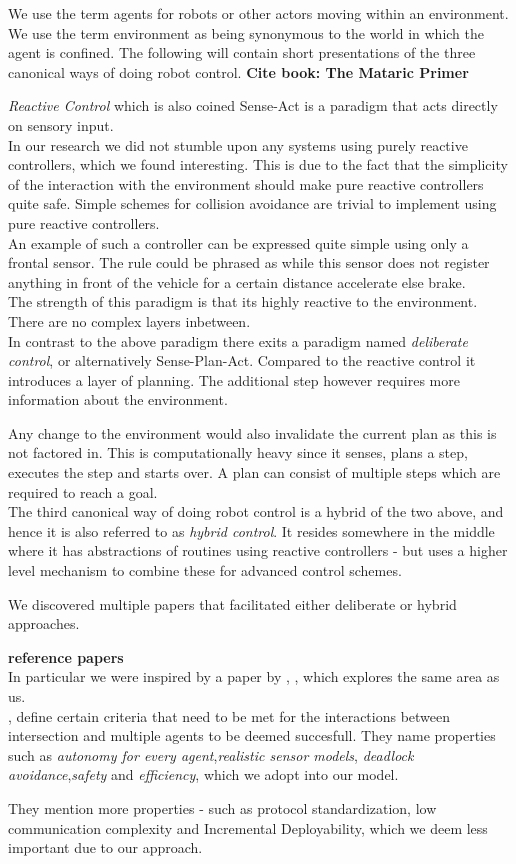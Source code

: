We use the term agents for robots or other actors moving within an environment.\\
We use the term environment as being synonymous to the world in which the agent is confined.
The following will contain short presentations of the three canonical ways of doing robot control.
\textbf{ Cite book: The Mataric Primer }

\textit{Reactive Control} which is also coined Sense-Act is a paradigm that acts directly on sensory input.\\
In our research we did not stumble upon any systems using purely reactive controllers, which we found interesting. This is due to the fact that the simplicity of the interaction with the environment should make pure reactive controllers quite safe.
Simple schemes for collision avoidance are trivial to implement using pure reactive controllers.\\
An example of such a controller can be expressed quite simple using only a frontal sensor. The rule could be phrased as while this sensor does not register anything in front of the vehicle for a certain distance accelerate else brake.\\
The strength of this paradigm is that its highly reactive to the environment. There are no complex layers inbetween.\\

In contrast to the above paradigm there exits a paradigm named \textit{deliberate control}, or alternatively Sense-Plan-Act.
Compared to the reactive control it introduces a layer of planning.
The additional step however requires more information about the environment.

Any change to the environment would also invalidate the current plan as this is not factored in.
This is computationally heavy since it senses, plans a step, executes the step and starts over.
A plan can consist of multiple steps which are required to reach a goal.\\

The third canonical way of doing robot control is a hybrid of the two above, and hence it is also referred to as \textit{hybrid control}.
It resides somewhere in the middle where it has abstractions of routines using reactive controllers - but uses a higher level mechanism to combine these for advanced control schemes.

We discovered multiple papers that facilitated either deliberate or hybrid approaches.

\textbf{reference papers}\\

In particular we were inspired by a paper by \citeauthor{texas}, \citep{texas}, which explores the same area as us.\\
\citeauthor{texas}, define certain criteria that need to be met for the interactions between intersection and multiple agents to be deemed succesfull.
They name properties such as \textit{autonomy for every agent},\textit{realistic sensor models}, \textit{deadlock avoidance},\textit{safety} and \textit{efficiency}, which we adopt into our model.

They mention more properties - such as protocol standardization, low communication complexity and Incremental Deployability, which we deem less important due to our approach.